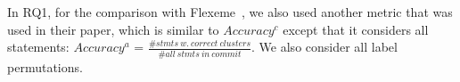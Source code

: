 In RQ1, for the comparison with Flexeme~\cite{flexeme-fse20}, we also
used another metric that was used in their paper, which is similar to
$Accuracy^{c}$ except that it considers all statements: $Accuracy^{a}$
= $\frac{\# stmts\:w.\:correct\:clusters}{\# all\:stmts\:in\:commit}$.
We also consider all label permutations.






